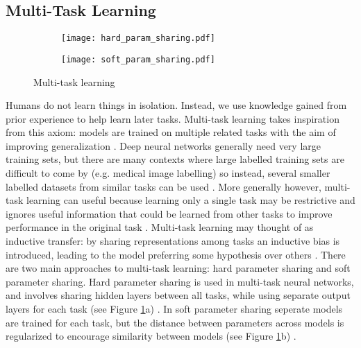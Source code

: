 \documentclass[Dissertation.tex]{subfiles}
\begin{document}
\subsection{Multi-Task Learning} \label{sec:multiTask}
\begin{figure}
	\centering
	\begin{subfigure}{0.5\linewidth}
		\centering
		\hspace*{2em}
		\texttt{[image: hard\_param\_sharing.pdf]}
	\end{subfigure}\begin{subfigure}{0.5\linewidth}
	\centering
			\hspace*{3em}
		\texttt{[image: soft\_param\_sharing.pdf]}
	\end{subfigure}
	\caption{Multi-task learning}
	\label{fig:multiLearning}
\end{figure}
Humans do not learn things in isolation. Instead, we use knowledge gained from prior experience to help learn later tasks. Multi-task learning takes inspiration from this axiom: models are trained on multiple related tasks with the aim of improving generalization \cite{zhangSurveyMultiTaskLearning2017}. Deep neural networks generally need very large training sets, but there are many contexts where large labelled training sets are difficult to come by (e.g. medical image labelling) so instead, several smaller labelled datasets from similar tasks can be used \cite{zhangSurveyMultiTaskLearning2017}. More generally however, multi-task learning can useful because learning only a single task may be restrictive and ignores useful information that could be learned from other tasks to improve performance in the original task \cite{ruderOverviewMultiTaskLearning2017}. Multi-task learning may thought of as inductive transfer: by sharing representations among tasks an inductive bias is introduced, leading to the model preferring some hypothesis over others \cite{ruderOverviewMultiTaskLearning2017}. There are two main approaches to multi-task learning: hard parameter sharing and soft parameter sharing.	Hard parameter sharing is used in multi-task neural networks, and involves sharing hidden layers between all tasks, while using separate output layers for each task (see Figure \ref{fig:multiLearning}a) \cite{ruderOverviewMultiTaskLearning2017}. In soft parameter sharing seperate models are trained for each task, but the distance between parameters across models is regularized to encourage similarity between models (see Figure \ref{fig:multiLearning}b) \cite{ruderOverviewMultiTaskLearning2017}.
\end{document}
